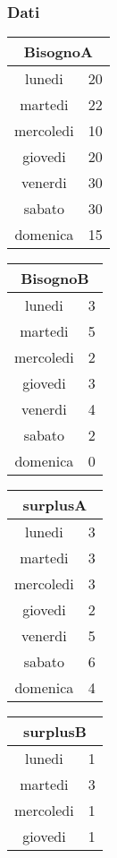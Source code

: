 \subsubsection{Dati}
\begin{center}
\begin{tabular}{| c | c |}
    \hline
    \multicolumn{2}{|c|}{BisognoA}\\
    \hline \hline
    lunedi & 20 \\
    martedi & 22 \\
    mercoledi & 10 \\
    giovedi & 20 \\
    venerdi & 30 \\
    sabato & 30 \\
    domenica & 15 \\
    \hline
\end{tabular}
\begin{tabular}{| c | c |}
    \hline
    \multicolumn{2}{|c|}{BisognoB}\\
    \hline \hline
    lunedi & 3 \\
    martedi & 5 \\
    mercoledi & 2 \\
    giovedi & 3 \\
    venerdi & 4 \\
    sabato & 2 \\
    domenica & 0 \\
    \hline
\end{tabular}
\begin{tabular}{| c | c |}
    \hline
    \multicolumn{2}{|c|}{surplusA}\\
    \hline \hline
    lunedi & 3 \\
    martedi & 3 \\
    mercoledi & 3 \\
    giovedi & 2 \\
    venerdi & 5 \\
    sabato & 6 \\
    domenica & 4 \\
    \hline
\end{tabular}
\begin{tabular}{| c | c |}
    \hline
    \multicolumn{2}{|c|}{surplusB}\\
    \hline \hline
    lunedi & 1 \\
    martedi & 3 \\
    mercoledi & 1 \\
    giovedi & 1 \\

\end{tabular}
\end{center}
